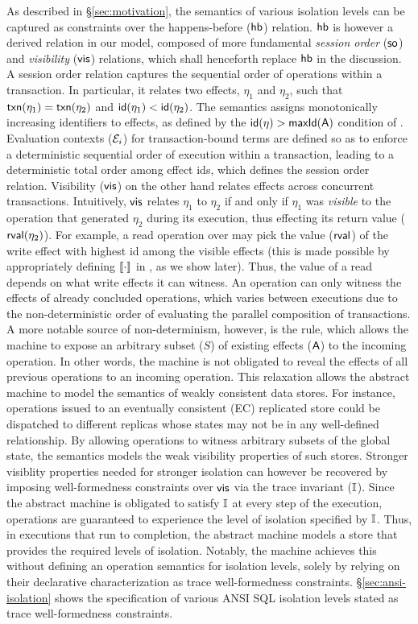 As described in \S\ref{sec:motivation}, the semantics of various
isolation levels can be captured as constraints over the
happens-before ($\textsf{hb}$) relation. $\textsf{hb}$ is however a derived relation
in our model, composed of more fundamental \emph{session order}
($\textsf{so}$) and \emph{visibility} ($\textsf{vis}$) relations, which shall
henceforth replace $\textsf{hb}$ in the discussion.  A session order relation
captures the sequential order of operations within a transaction. In
particular, it relates two effects, $\eta_1$ and $\eta_2$, such that
$\textsf{txn}(\eta_1) = \textsf{txn}(\eta_2)$ and $\textsf{id}(\eta_1) < \textsf{id}(\eta_2)$.  The
semantics assigns monotonically increasing identifiers to effects, as
defined by the $\textsf{id}(\eta) > \textsf{maxId}(\textsf{A})$ condition of
.  Evaluation contexts ($\mathcal{E}_i$) for
transaction-bound terms are defined so as to enforce a deterministic
sequential order of execution within a transaction, leading to a
deterministic total order among effect ids, which defines the session
order relation. Visibility ($\textsf{vis}$) on the other hand relates effects
across concurrent transactions.  Intuitively, $\textsf{vis}$ relates $\eta_1$
to $\eta_2$ if and only if $\eta_1$ was \emph{visible} to the
operation that generated $\eta_2$ during its execution, thus effecting
its return value ($\textsf{rval}(\eta_2)$). For example, a read operation over
 may pick the value ($\textsf{rval}$) of the write effect with highest id
among the visible effects (this is made possible by appropriately
defining $\llbracket \cdot \rrbracket$ in , as we show later).
Thus, the value of a read depends on what write effects it can
witness. An operation can only witness the effects of already
concluded operations, which varies between executions due to the
non-deterministic order of evaluating the parallel composition of
transactions. A more notable source of non-determinism, however, is
the  rule, which allows the machine to expose an
arbitrary subset ($S$) of existing effects ($\textsf{A}$) to the incoming
operation. In other words, the machine is not obligated to reveal the
effects of all previous operations to an incoming operation. This
relaxation allows the abstract machine to model the semantics of
weakly consistent data stores. For instance, operations issued to an
eventually consistent (EC) replicated store could be dispatched to
different replicas whose states may not be in any well-defined
relationship. By allowing operations to witness arbitrary subsets of
the global state, the semantics models the weak visibility properties
of such stores. Stronger visiblity properties needed for stronger
isolation can however be recovered by imposing well-formedness
constraints over $\textsf{vis}$ via the trace invariant ($\mathbb{I}$). Since the
abstract machine is obligated to satisfy $\mathbb{I}$ at every step of the
execution, operations are guaranteed to experience the level of
isolation specified by $\mathbb{I}$.  Thus, in executions that run to
completion, the abstract machine models a store that provides the
required levels of isolation.  Notably, the machine achieves this
without defining an operation semantics for isolation levels, solely
by relying on their declarative characterization as trace
well-formedness constraints.  \S\ref{sec:ansi-isolation} shows the
specification of various ANSI SQL isolation levels stated as trace
well-formedness constraints.

